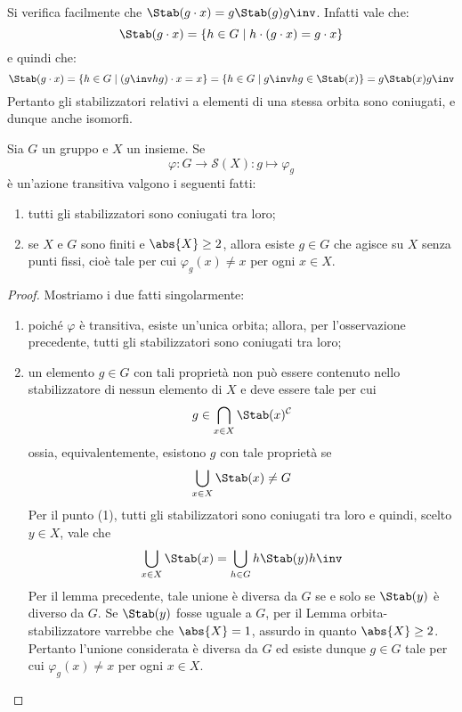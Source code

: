 \documentclass[11pt]{scrartcl}
\begin{document}
	\begin{remark}
		Si verifica facilmente che $\Stab(g \cdot x) = g \Stab(g) g\inv$. Infatti
		vale che:
		\[ \Stab(g \cdot x) = \{ h \in G \mid h \cdot (g \cdot x) = g \cdot x \} \]
		e quindi che:
		\[ \Stab(g \cdot x) = \{ h \in G \mid (g\inv h g) \cdot x = x \} = \{ h \in G \mid g\inv h g \in \Stab(x) \} = g \Stab(x) g\inv \]
		Pertanto gli stabilizzatori relativi a elementi di una stessa orbita sono
		coniugati, e dunque anche isomorfi.
	\end{remark}
	
	\begin{proposition}
		\label{prop1.41}
		Sia $G$ un gruppo e $X$ un insieme. Se 
		\[
		\varphi:G \to \mathcal{S}(X) :g \mapsto \varphi_g
		\] è un'azione transitiva valgono i seguenti fatti:
		\begin{enumerate}[(1)]
			\item tutti gli stabilizzatori sono coniugati tra loro;
			\item se $X$ e $G$ sono finiti e $\abs{X} \geq 2$, allora esiste $g \in G$ che agisce su $X$ senza
			punti fissi, cioè tale per cui $\varphi_g(x) \neq x$ per ogni $x \in X$.
		\end{enumerate}
	\end{proposition}
	
	\begin{proof}
		Mostriamo i due fatti singolarmente:
		\begin{enumerate}[(1)]
			\item poiché $\varphi$ è transitiva, esiste un'unica orbita; allora,
			per l'osservazione precedente, tutti gli stabilizzatori sono coniugati tra
			loro;
			\item un elemento $g \in G$ con tali proprietà non può essere contenuto 
			nello stabilizzatore di nessun elemento di $X$ e deve essere tale
			per cui
			\[
			g \in \bigcap_{x \in X}\Stab(x)^{\mathcal{C}}
			\]
			ossia, equivalentemente, esistono $g$ con tale proprietà se
			\[
			\bigcup_{x \in X} \Stab(x) \neq G
			\]
			Per il punto (1), tutti gli stabilizzatori sono coniugati tra loro
			e quindi, scelto $y \in X$, vale che
			\[
			\bigcup_{x \in X} \Stab(x) = \bigcup_{h \in G} h \Stab(y) h\inv
			\]
			Per il lemma precedente, tale unione è diversa da $G$ se e solo se $\Stab(y)$ è diverso da $G$. Se $\Stab(y)$ fosse uguale a $G$, per il Lemma orbita-stabilizzatore
			varrebbe che $\abs{X} = 1$, assurdo in quanto $\abs{X} \geq 2$.
			Pertanto l'unione considerata è diversa da $G$ ed esiste dunque $g \in G$
			tale per cui $\varphi_g(x) \neq x$ per ogni $x \in X$.
		\end{enumerate}
	\end{proof}
	
\end{document}
